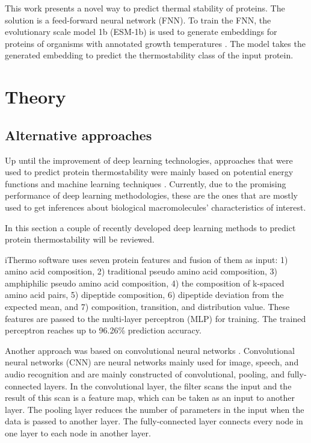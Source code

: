 \documentclass[12pt]{article}
\begin{document}
	This work presents a novel way to predict thermal stability of proteins. 
	The solution is a feed-forward neural network (FNN). To train the FNN, 
	the evolutionary scale model 1b (ESM-1b)\cite{rives2021biological} is used to 
	generate embeddings for proteins of organisms with annotated growth 
	temperatures \cite{engqvist_martin_karl_magnus_2018_1175609}. The model 
	takes the generated embedding to predict the thermostability class of the 
	input protein.

	\newpage

	\section{Theory}

	\subsection{Alternative approaches}

	Up until the improvement of deep learning technologies,  
	approaches that were used to predict protein thermostability were mainly
	based on potential energy functions and machine learning techniques 
	\cite{modarres2016protein}. Currently, due to the promising performance 
	of deep learning methodologies, these are the ones that are mostly used 
	to get inferences about biological macromolecules' characteristics of 
	interest.

	In this section a couple of recently developed deep learning methods to 
	predict protein thermostability will be reviewed. 
	
	iThermo software \cite{ahmed2022ithermo} uses seven protein features 
	and fusion of them as input: 1) amino 
	acid composition, 2) traditional pseudo amino acid composition, 
	3) amphiphilic pseudo amino acid composition, 4) the composition of 
	k-spaced amino acid pairs, 5) dipeptide composition, 6) dipeptide 
	deviation from the expected mean, and 7) composition, transition, 
	and distribution value. These features are passed to the multi-layer 
	perceptron 
	(MLP) for training. The trained perceptron reaches up to 96.26\% 
	prediction accuracy.

	Another approach was based on convolutional neural networks 
	\cite{fang2019convolution}. Convolutional neural networks (CNN)
	are neural networks mainly used for image, speech, and audio recognition
	and are mainly constructed of convolutional, pooling, and fully-connected 
	layers. In the convolutional layer, the filter scans the input and the
	result of this scan is a feature map, which can be taken as an input
	to another layer. The pooling layer reduces the 
	number of parameters in the input when the data is passed to another 
	layer. The fully-connected layer connects 
	every node in one layer to each node in another layer.
	
\end{document}
